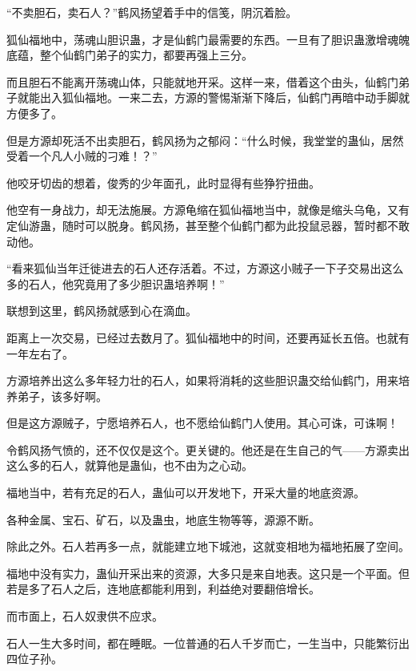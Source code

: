 
\begin{this_body}



“不卖胆石，卖石人？”鹤风扬望着手中的信笺，阴沉着脸。

狐仙福地中，荡魂山胆识蛊，才是仙鹤门最需要的东西。一旦有了胆识蛊激增魂魄底蕴，整个仙鹤门弟子的实力，都要再强上三分。

而且胆石不能离开荡魂山体，只能就地开采。这样一来，借着这个由头，仙鹤门弟子就能出入狐仙福地。一来二去，方源的警惕渐渐下降后，仙鹤门再暗中动手脚就方便多了。

但是方源却死活不出卖胆石，鹤风扬为之郁闷：“什么时候，我堂堂的蛊仙，居然受着一个凡人小贼的刁难！？”

他咬牙切齿的想着，俊秀的少年面孔，此时显得有些狰狞扭曲。

他空有一身战力，却无法施展。方源龟缩在狐仙福地当中，就像是缩头乌龟，又有定仙游蛊，随时可以脱身。鹤风扬，甚至整个仙鹤门都为此投鼠忌器，暂时都不敢动他。

“看来狐仙当年迁徙进去的石人还存活着。不过，方源这小贼子一下子交易出这么多的石人，他究竟用了多少胆识蛊培养啊！”

联想到这里，鹤风扬就感到心在滴血。

距离上一次交易，已经过去数月了。狐仙福地中的时间，还要再延长五倍。也就有一年左右了。

方源培养出这么多年轻力壮的石人，如果将消耗的这些胆识蛊交给仙鹤门，用来培养弟子，该多好啊。

但是这方源贼子，宁愿培养石人，也不愿给仙鹤门人使用。其心可诛，可诛啊！

令鹤风扬气愤的，还不仅仅是这个。更关键的。他还是在生自己的气——方源卖出这么多的石人，就算他是蛊仙，也不由为之心动。

福地当中，若有充足的石人，蛊仙可以开发地下，开采大量的地底资源。

各种金属、宝石、矿石，以及蛊虫，地底生物等等，源源不断。

除此之外。石人若再多一点，就能建立地下城池，这就变相地为福地拓展了空间。

福地中没有实力，蛊仙开采出来的资源，大多只是来自地表。这只是一个平面。但若是多了石人之后，连地底都能利用到，利益绝对要翻倍增长。

而市面上，石人奴隶供不应求。

石人一生大多时间，都在睡眠。一位普通的石人千岁而亡，一生当中，只能繁衍出四位子孙。


\end{this_body}
